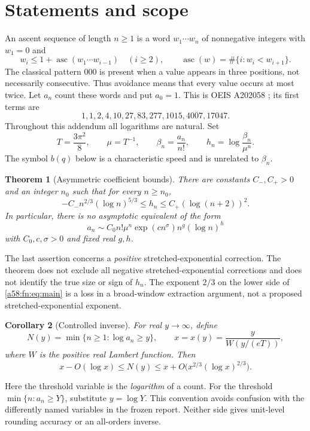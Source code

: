 \documentclass[11pt,letterpaper]{article}
\newtheorem{theorem}{Theorem}[section]
\newtheorem{corollary}[theorem]{Corollary}
\theoremstyle{remark}
\newcommand{\asc}{\operatorname{asc}}
\begin{document}
\section{Statements and scope}
An ascent sequence of length $n\ge1$ is a word $w_1\cdots w_n$ of nonnegative integers with $w_1=0$ and
\[
 w_i\le1+\asc(w_1\cdots w_{i-1})\quad(i\ge2),\qquad
 \asc(w)=\#\{i:w_i<w_{i+1}\}.
\]
The classical pattern $000$ is present when a value appears in three positions, not necessarily consecutive. Thus avoidance means that every value occurs at most twice. Let $a_n$ count these words and put $a_0=1$. This is OEIS A202058 \cite{OEIS}; its first terms are
\[
1,1,2,4,10,27,83,277,1015,4007,17047.
\]
Throughout this addendum all logarithms are natural. Set
\[
 T=\frac{3\pi^2}{8},\qquad \mu=T^{-1},\qquad
 \beta_n=\frac{a_n}{n!},\qquad h_n=\log\frac{\beta_n}{\mu^n}.
\]
The symbol $b(q)$ below is a characteristic speed and is unrelated to $\beta_n$.

\begin{theorem}[Asymmetric coefficient bounds]\label{a58:fn:thm:main}
There are constants $C_-,C_+>0$ and an integer $n_0$ such that for every $n\ge n_0$,
\begin{equation}\label{a58:fn:eq:main}
 -C_-n^{2/3}(\log n)^{5/3}
 \le h_n\le C_+(\log(n+2))^2.
\end{equation}
In particular, there is no asymptotic equivalent of the form
\[
 a_n\sim C_0 n!\mu^n\exp(cn^\sigma)n^g(\log n)^h
\]
with $C_0,c,\sigma>0$ and fixed real $g,h$.
\end{theorem}
The last assertion concerns a \emph{positive} stretched-exponential correction. The theorem does not exclude all negative stretched-exponential corrections and does not identify the true size or sign of $h_n$. The exponent $2/3$ on the lower side of \eqref{a58:fn:eq:main} is a loss in a broad-window extraction argument, not a proposed stretched-exponential exponent.

\begin{corollary}[Controlled inverse]\label{a58:fn:cor:maininverse}
For real $y\to\infty$, define
\[
 N(y)=\min\{n\ge1:\log a_n\ge y\},\qquad
 x=x(y)=\frac{y}{W(y/(eT))},
\]
where $W$ is the positive real Lambert function. Then
\begin{equation}\label{a58:fn:eq:inverse}
 x-O(\log x)\le N(y)\le
 x+O\bigl(x^{2/3}(\log x)^{2/3}\bigr).
\end{equation}
\end{corollary}
Here the threshold variable is the \emph{logarithm} of a count. For the threshold $\min\{n:a_n\ge Y\}$, substitute $y=\log Y$. This convention avoids confusion with the differently named variables in the frozen report. Neither side gives unit-level rounding accuracy or an all-orders inverse.
\end{document}
